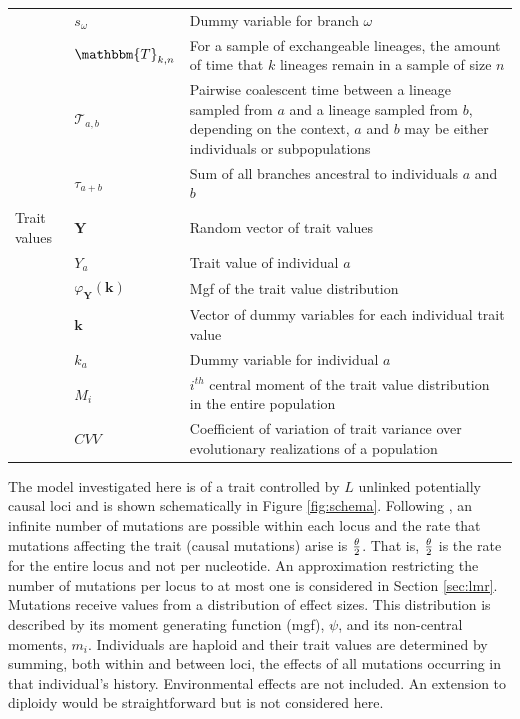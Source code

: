 \begin{table}
\begin{tabular}{l l l}
                                         & $s_\omega$ & Dummy variable for branch $\omega$ \\
                                         & $\mathbbm{T}_{k,n}$ & \multicolumn{1}{p{10cm}}{For a sample of exchangeable lineages, the amount of time that $k$ lineages remain in a sample of size $n$}\\
                                         & $\mathcal{T}_{a,b}$ & \multicolumn{1}{p{10cm}}{Pairwise coalescent time between a lineage sampled from $a$ and a lineage sampled from $b$, depending on the context, $a$ and $b$ may be either individuals or subpopulations}\\
                                         & $\tau_{a+b}$ & Sum of all branches ancestral to individuals $a$ and $b$\\
    Trait values & $\mathbf{Y}$ & Random vector of trait values \\
                                         & $Y_a$ & Trait value of individual $a$\\
                                         & $\varphi_{\mathbf{Y}}(\mathbf{k})$ & Mgf of the trait value distribution \\
                                         & $\mathbf{k}$ & \multicolumn{1}{p{10cm}}{Vector of dummy variables for each individual trait value}\\
                                         & $k_a$ & Dummy variable for individual $a$\\
                                         & $M_i$ & \multicolumn{1}{p{10cm}}{$i^{th}$ central moment of the trait value distribution in the entire population}\\
                                         & $CVV$ & \multicolumn{1}{p{10cm}}{Coefficient of variation of trait variance over evolutionary realizations of a population}\\
    \hline
  \end{tabular}
  \label{notation}
\end{table}

The model investigated here is of a trait controlled by $L$ unlinked potentially
causal loci and is shown schematically in Figure \ref{fig:schema}. Following
\citet{Kimura1969}, an infinite number of mutations are possible within each
locus and the rate that mutations affecting the trait (causal mutations) arise
is $\frac{\theta}{2}$. That is, $\frac{\theta}{2}$ is the rate for the entire locus and not per nucleotide.
An approximation restricting the number of mutations per locus to at most one is
considered in Section \ref{sec:lmr}. Mutations receive values from a
distribution of effect sizes. This distribution is described by its moment
generating function (mgf), $\psi$, and its non-central moments, $m_i$.
Individuals are haploid and their trait values are determined by summing, both
within and between loci, the effects of all mutations occurring in that
individual's history. Environmental effects are not included. An extension to
diploidy would be straightforward but is not considered here.

